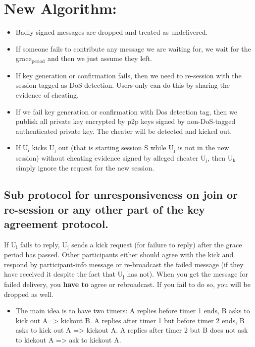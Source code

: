 \documentclass[11pt]{article}
\begin{document}
\section{New Algorithm:}
\label{sec-8}
\begin{itemize}
\item Badly signed messages are dropped and treated as undelivered.
\item If someone fails to contribute any message we are waiting for, we wait for the grace$_{\text{period}}$
    and then we just assume they left.
\item If key generation or confirmation fails, then we need to re-session with the session 
tagged as DoS detection. Users only can do this by sharing the evidence of cheating.
\item If we fail key generation or confirmation with Dos detection tag, then we publish
all private key encrypted by p2p keys signed by non-DoS-tagged authenticated
private key. The cheater will be detected and kicked out.
\item If U$_{\text{i}}$ kicks U$_{\text{j}}$ out (that is starting session S while U$_{\text{j}}$ is not in the 
new session) without cheating evidence signed by alleged cheater U$_{\text{j}}$, then U$_{\text{k}}$ simply ignore the request 
for the new session.
\end{itemize}

\subsection{Sub protocol for unresponsiveness on join or re-session or any other part of the key agreement protocol.}
\label{sec-8-1}
If U$_{\text{i}}$ fails to reply, U$_{\text{j}}$ sends a kick request (for failure to reply) after the grace period has passed.
Other participants either should agree with the kick and respond by participant-info message or re-broadcast the failed message (if they have received it despite the fact that U$_{\text{j}}$ has not). When 
you get the message for failed delivery, you \textbf{have to} agree or rebroadcast. If you fail to do so, you will be dropped as well.

\begin{itemize}
\item The main idea is to have two timers:
A replies before timer 1 ends, B asks to kick out A=> kickout B.
A replies after timer 1 but before timer 2 ends, B asks to kick out A => kickout A.
A replies after timer 2 but B does not ask to kickout A => ask to kickout A.
\end{itemize}
\end{document}
